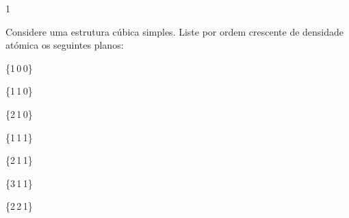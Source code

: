 \documentclass[\mainfilename]{subfiles}
\begin{document}
\begin{questionBox}1{ %
    Considere uma estrutura cúbica simples. Liste por ordem crescente de densidade atómica os seguintes planos:
    \begin{itemize}
        \begin{multicols}{4}
            \item \{1\,0\,0\}
            \item \{1\,1\,0\}
            \item \{2\,1\,0\}
            \item \{1\,1\,1\}
            \item \{2\,1\,1\}
            \item \{3\,1\,1\}
            \item \{2\,2\,1\}
        \end{multicols}
    \end{itemize}
} %
\end{questionBox}
\end{document}
